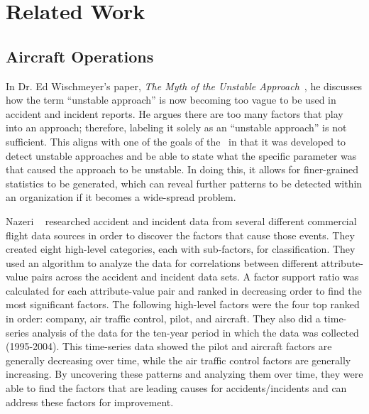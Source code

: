 \chapter{Related Work} \label{ch:related_work}

\section{Aircraft Operations}

	In Dr. Ed Wischmeyer's paper, \emph{The Myth of the Unstable Approach}~\cite{wischmeyer2004the-myth}, he discusses how the term ``unstable approach'' is now becoming too vague to be used in accident and incident reports.  He argues there are too many factors that play into an approach; therefore, labeling it solely as an ``unstable approach'' is not sufficient.  This aligns with one of the goals of the \toolname\ in that it was developed to detect unstable approaches and be able to state what the specific parameter was that caused the approach to be unstable.  In doing this, it allows for finer-grained statistics to be generated, which can reveal further patterns to be detected within an organization if it becomes a wide-spread problem.
    
    Nazeri \etal~\cite{Nazeri:2008:Analyzing-Relat} researched accident and incident data from several different commercial flight data sources in order to discover the factors that cause those events.  They created eight high-level categories, each with sub-factors, for classification.  They used an algorithm to analyze the data for correlations between different attribute-value pairs across the accident and incident data sets.  A factor support ratio was calculated for each attribute-value pair and ranked in decreasing order to find the most significant factors.  The following high-level factors were the four top ranked in order:  company, air traffic control, pilot, and aircraft.  They also did a time-series analysis of the data for the ten-year period in which the data was collected (1995-2004).  This time-series data showed the pilot and aircraft factors are generally decreasing over time, while the air traffic control factors are generally increasing.  By uncovering these patterns and analyzing them over time, they were able to find the factors that are leading causes for accidents/incidents and can address these factors for improvement.


